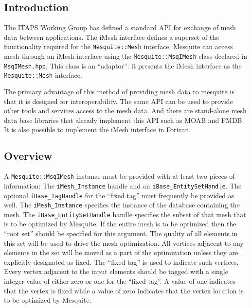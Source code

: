 \subsection{Introduction}

The ITAPS Working Group has defined a standard API for exchange of mesh data between applications.  The iMesh interface\cite{imesh} defines a superset of the functionality required for the \texttt{Mesquite::Mesh} interface.  Mesquite can access mesh through an iMesh interface using the \texttt{Mesquite::MsqIMesh} class declared in \texttt{MsqIMesh.hpp}.  This class is an ``adaptor'':  it presents the iMesh interface as the \texttt{Mesquite::Mesh} interface.  

The primary advantage of this method of providing mesh data to mesquite is that it is designed for interoperability.  The same API can be used to provide other tools and services access to the mesh data.  And there are stand-alone mesh data base libraries that already implement this API such as MOAB\cite{MOAB-webpage} and FMDB\cite{FMDB-webpage}.  It is also possible to implement the iMesh interface in Fortran.

\subsection{Overview}

A \texttt{Mesquite::MsqIMesh} instance must be provided with at least two pieces of information: The \texttt{iMesh\_Instance} handle and an \texttt{iBase\_EntitySetHandle}.  The optional \texttt{iBase\_TagHandle} for the ``fixed tag'' must frequently be provided as well.  The \texttt{iMesh\_Instance} specifies the instance of the database containing the mesh.  The \texttt{iBase\_EntitySetHandle} handle specifies the subset of that mesh that is to be optimized by Mesquite.  If the entire mesh is to be optimized then the ``root set'' should be specified for this argument.  The quality of all elements in this set will be used to drive the mesh optimization.  All vertices adjacent to any elements in the set will be moved as a part of the optimization unless they are explicitly designated as fixed.  The ``fixed tag'' is used to indicate such vertices.  Every vertex adjacent to the input elements should be tagged with a single integer value of either zero or one for the ``fixed tag''.  A value of one indicates that the vertex is fixed while a value of zero indicates that the vertex location is to be optimized by Mesquite.

